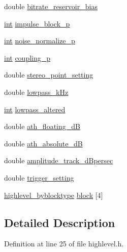 \begin{DoxyCompactItemize}
\item 
double \hyperlink{structhighlevel__encode__setup_a797b88513e6d903fa82509ebb3981e39}{bitrate\+\_\+reservoir\+\_\+bias}
\item 
\hyperlink{xmltok_8h_a5a0d4a5641ce434f1d23533f2b2e6653}{int} \hyperlink{structhighlevel__encode__setup_ab9526c19e5ba4e42bb9c82f19b25eb1f}{impulse\+\_\+block\+\_\+p}
\item 
\hyperlink{xmltok_8h_a5a0d4a5641ce434f1d23533f2b2e6653}{int} \hyperlink{structhighlevel__encode__setup_ab7b86cbf9e1b9eda7120da4063cae4d9}{noise\+\_\+normalize\+\_\+p}
\item 
\hyperlink{xmltok_8h_a5a0d4a5641ce434f1d23533f2b2e6653}{int} \hyperlink{structhighlevel__encode__setup_a6b1b3c1aba15cfd92834b950c682b036}{coupling\+\_\+p}
\item 
double \hyperlink{structhighlevel__encode__setup_a88400017ddc1bfd63762d42adb543238}{stereo\+\_\+point\+\_\+setting}
\item 
double \hyperlink{structhighlevel__encode__setup_ada5a59b19ecd30dfa5d876eb66c8e0ce}{lowpass\+\_\+k\+Hz}
\item 
\hyperlink{xmltok_8h_a5a0d4a5641ce434f1d23533f2b2e6653}{int} \hyperlink{structhighlevel__encode__setup_af62698a474d022bcdb6c04814e84f2ae}{lowpass\+\_\+altered}
\item 
double \hyperlink{structhighlevel__encode__setup_ab14fa6d156e75fe4d00f054776129077}{ath\+\_\+floating\+\_\+dB}
\item 
double \hyperlink{structhighlevel__encode__setup_aecc557dc95d32f87df532574ca5205d5}{ath\+\_\+absolute\+\_\+dB}
\item 
double \hyperlink{structhighlevel__encode__setup_a45038ea755b1204635bc8d93f2527877}{amplitude\+\_\+track\+\_\+d\+Bpersec}
\item 
double \hyperlink{structhighlevel__encode__setup_adfa8e20fbbc4af279909d1a2aab5822f}{trigger\+\_\+setting}
\item 
\hyperlink{structhighlevel__byblocktype}{highlevel\+\_\+byblocktype} \hyperlink{structhighlevel__encode__setup_ab4c8b364012b7b4fa38d94ec17c645cd}{block} \mbox{[}4\mbox{]}
\end{DoxyCompactItemize}


\subsection{Detailed Description}


Definition at line 25 of file highlevel.\+h.



